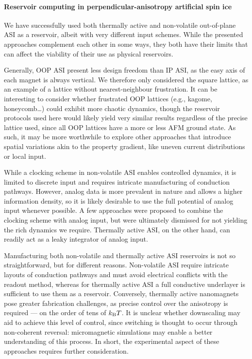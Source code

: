 \paragraph{Reservoir computing in perpendicular-anisotropy artificial spin ice}
We have successfully used both thermally active and non-volatile out-of-plane ASI as a reservoir, albeit with very different input schemes.
While the presented approaches complement each other in some ways, they both have their limits that can affect the viability of their use as physical reservoirs. \\\par

Generally, OOP ASI present less design freedom than IP ASI, as the easy axis of each magnet is always vertical.
We therefore only considered the square lattice, as an example of a lattice without nearest-neighbour frustration.
It can be interesting to consider whether frustrated OOP lattices (e.g., kagome, honeycomb\dots) could exhibit more chaotic dynamics, though the reservoir protocols used here would likely yield very similar results regardless of the precise lattice used, since all OOP lattices have a more or less AFM ground state.
As such, it may be more worthwhile to explore other approaches that introduce spatial variations akin to the property gradient, like uneven current distributions or local input. \\\par

While a clocking scheme in non-volatile ASI enables controlled dynamics, it is limited to discrete input and requires intricate manufacturing of conduction pathways.
However, analog data is more prevalent in nature and allows a higher information density, so it is likely desirable to use the full potential of analog input whenever possible.
A few approaches were proposed to combine the clocking scheme with analog input, but were ultimately dismissed for not yielding the rich dynamics we require.
Thermally active ASI, on the other hand, can readily act as a leaky integrator of analog input. \par
Manufacturing both non-volatile and thermally active ASI reservoirs is not so straightforward, but for different reasons.
Non-volatile ASI require intricate layouts of conduction pathways and must avoid electrical conflicts with the readout method, whereas for thermally active ASI a full conductive underlayer is sufficient to use them as a reservoir.
Conversely, thermally active nanomagnets pose greater fabrication challenges, as precise control over the anisotropy is required --- on the order of tens of $\kBT$.
It is unclear whether downscaling may aid to achieve this level of control, since switching is thought to occur through non-coherent reversal: micromagnetic simulations may enable a better understanding of this process.
In short, the experimental aspect of these approaches requires further consideration. \\\par


